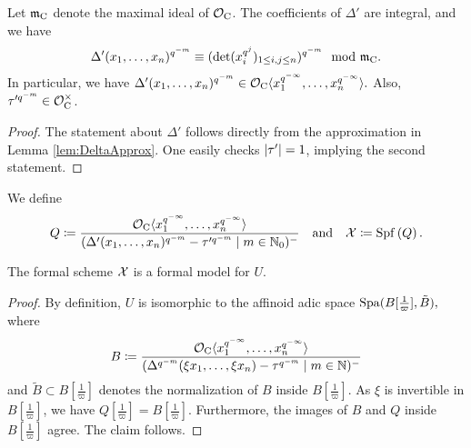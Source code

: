 \documentclass[../main.tex]{subfiles}
\begin{document}
\begin{lem}\label{lem:PropsOfDeltaPrAndTauPr}
  Let $\mathfrak{m}_{\mathrm{C}}$ denote the maximal ideal of $\mathcal{O}_{\mathrm{C}}$. The coefficients of $\Delta'$ are 
  integral, and we have
  \begin{equation*}
    \Delta'(x_1, \dots, x_n)^{q^{-m}} \equiv (\det(x_i^{q^j})_{1 \leq i,j \leq
    n})^{q^{-m}} \mod {\mathfrak{m}}_{\mathrm{C}}.
  \end{equation*}
  In particular, we have 
  $\Delta'(x_1, \dots, x_n)^{q^{-m}} \in \mathcal{O}_{\mathrm{C}} \langle x_1^{q^{-\infty}}, \dots
  , x_n^{q^{-\infty}}\rangle.$
  Also, $\tau'^{q^{-m}} \in \mathcal{O}_{\mathrm{C}}^\times$. 
\begin{proof}
  The statement about $\Delta'$ follows directly from the approximation in Lemma
  \ref{lem:DeltaApprox}. One easily checks $\lvert \tau' \rvert = 1$, implying the second
  statement.
\end{proof}
\end{lem}

We define 
\begin{equation*}
  Q \coloneq \frac
    {\mathcal{O}_{\mathrm{C}} \langle x_1^{q^{-\infty}}, \dots , x_n^{q^{-\infty}}
      \rangle}
      {(\Delta'(x_1, \dots, x_n)^{q^{-m}} - \tau'^{q^{-m}} \mid m \in \mathbb{N}_0)^-}
      \quad \text{and} \quad
  \mathcal{X} \coloneq \operatorname{Spf} \left( Q \right).
\end{equation*}

\begin{prop}\label{prop:AffinoidIsFormalModel}
  The formal scheme $\mathcal{X}$ is a formal model for $U$. 
\end{prop}
\begin{proof} 
  By definition, $U$ is isomorphic to the affinoid adic space $\operatorname{Spa}(B[\tfrac 1\varpi], \tilde B),$ where
  \begin{equation*}
    B \coloneqq \frac{\mathcal{O}_{\mathrm{C}} \langle x_1^{q^{-\infty}}, \dots,
    x_n^{q^{-\infty}} \rangle}
    {(\Delta^{q^{-m}}(\xi x_1, \dots, \xi x_n) - \tau^{q^{-m}} \mid m \in \mathbb{N})^-}
  \end{equation*}
  and $\tilde B \subset B[\tfrac 1\varpi]$ denotes the normalization of 
  $B$ inside $B[\tfrac 1 \varpi]$. 
  As $\xi$ is invertible in $B[\tfrac 1 \varpi]$, we have 
  $Q[\tfrac 1 \varpi] = B[\tfrac 1 \varpi]$. Furthermore, the images of 
  $B$ and $Q$ inside $B[\tfrac 1 \varpi]$ agree. The claim follows.
\end{proof}
\end{document}
